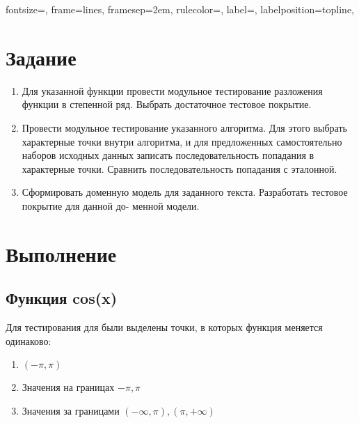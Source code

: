 
\isonefalse
\def \labnum {1}
\def \labsubj {Тестирование программного обеспечения}
\def \labauthor {Айтуганов Д. А. \\ Чебыкин И. Б.}
\def \labgroup {P3301}
\isinspfalse
\def \labinsp {}
\def \labname {Вариант: 756}
\isnametrue

\usepackage{graphicx}
\usepackage{verbatim}
\usepackage[dvipsnames]{xcolor}

\usepackage{fancyvrb}

 {
 fontsize=\scriptsize,
 frame=lines,  %
 framesep=2em, %
 rulecolor=\color{Gray},
 label=,
 labelposition=topline,
}



\section{Задание}
\begin{enumerate}
\item Для указанной функции провести модульное тестирование разложения функции в степенной ряд. Выбрать достаточное тестовое покрытие.

\item Провести модульное тестирование указанного алгоритма. Для этого выбрать характерные точки внутри алгоритма, и для предложенных самостоятельно наборов исходных данных записать последовательность
попадания в характерные точки. Сравнить последовательность попадания с эталонной.  \item Сформировать доменную модель для заданного текста. Разработать тестовое покрытие для данной до-
менной модели.
\end{enumerate}

\section{Выполнение}

\subsection{Функция cos(x)}
Для тестирования для были выделены точки, в которых функция меняется одинаково:
\begin{enumerate}
\item $(-\pi, \pi)$
\item Значения на границах $-\pi, \pi$
\item Значения за границами $(-\infty, \pi), (\pi, +\infty)$
\end{enumerate}

